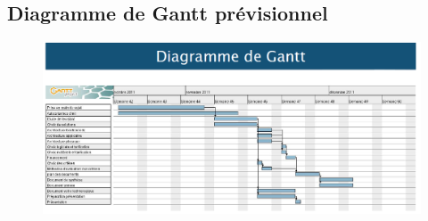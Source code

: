 \subsection{Diagramme de Gantt prévisionnel}

\begin{figure}[!h]
\includegraphics[scale=0.7,angle=90]{gantt.png}
\end{figure}